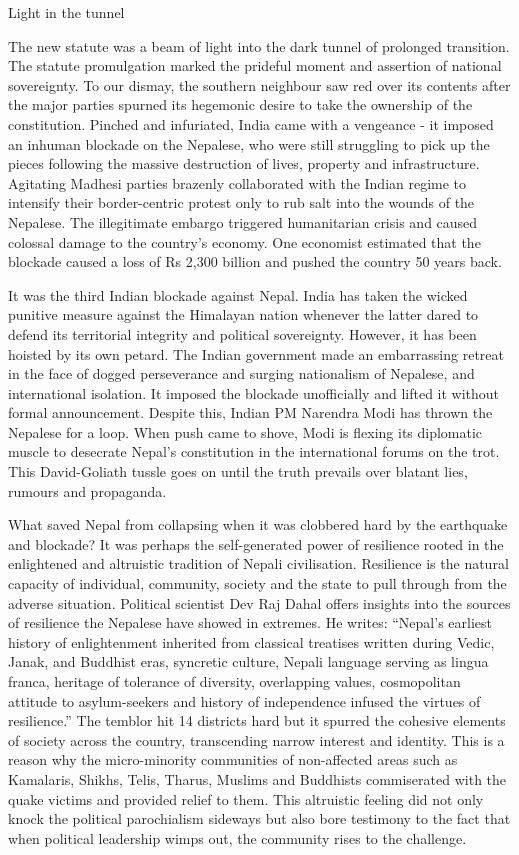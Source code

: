 \documentclass[
  openany]{book}
\begin{document}
Light in the tunnel

The new statute was a beam of light into the dark tunnel of prolonged transition. The statute promulgation marked the prideful moment and assertion of national sovereignty. To our dismay, the southern neighbour saw red over its contents after the major parties spurned its hegemonic desire to take the ownership of the constitution. Pinched and infuriated, India came with a vengeance - it imposed an inhuman blockade on the Nepalese, who were still struggling to pick up the pieces following the massive destruction of lives, property and infrastructure. Agitating Madhesi parties brazenly collaborated with the Indian regime to intensify their border-centric protest only to rub salt into the wounds of the Nepalese. The illegitimate embargo triggered humanitarian crisis and caused colossal damage to the country's economy. One economist estimated that the blockade caused a loss of Rs 2,300 billion and pushed the country 50 years back.

It was the third Indian blockade against Nepal. India has taken the wicked punitive measure against the Himalayan nation whenever the latter dared to defend its territorial integrity and political sovereignty. However, it has been hoisted by its own petard. The Indian government made an embarrassing retreat in the face of dogged perseverance and surging nationalism of Nepalese, and international isolation. It imposed the blockade unofficially and lifted it without formal announcement. Despite this, Indian PM Narendra Modi has thrown the Nepalese for a loop. When push came to shove, Modi is flexing its diplomatic muscle to desecrate Nepal's constitution in the international forums on the trot. This David-Goliath tussle goes on until the truth prevails over blatant lies, rumours and propaganda.

What saved Nepal from collapsing when it was clobbered hard by the earthquake and blockade? It was perhaps the self-generated power of resilience rooted in the enlightened and altruistic tradition of Nepali civilisation. Resilience is the natural capacity of individual, community, society and the state to pull through from the adverse situation. Political scientist Dev Raj Dahal offers insights into the sources of resilience the Nepalese have showed in extremes. He writes: ``Nepal's earliest history of enlightenment inherited from classical treatises written during Vedic, Janak, and Buddhist eras, syncretic culture, Nepali language serving as lingua franca, heritage of tolerance of diversity, overlapping values, cosmopolitan attitude to asylum-seekers and history of independence infused the virtues of resilience.'' The temblor hit 14 districts hard but it spurred the cohesive elements of society across the country, transcending narrow interest and identity. This is a reason why the micro-minority communities of non-affected areas such as Kamalaris, Shikhs, Telis, Tharus, Muslims and Buddhists commiserated with the quake victims and provided relief to them. This altruistic feeling did not only knock the political parochialism sideways but also bore testimony to the fact that when political leadership wimps out, the community rises to the challenge.
\end{document}
